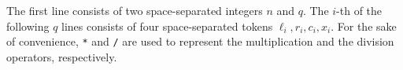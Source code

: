 The first line consists of two space-separated integers $n$ and $q$.
The $i$-th of the following $q$ lines consists of four space-separated
tokens $\ell_i, r_i, c_i, x_i$. 
For the sake of convenience, \verb+*+ and \verb+/+ are used to represent
the multiplication and the division operators, respectively.
